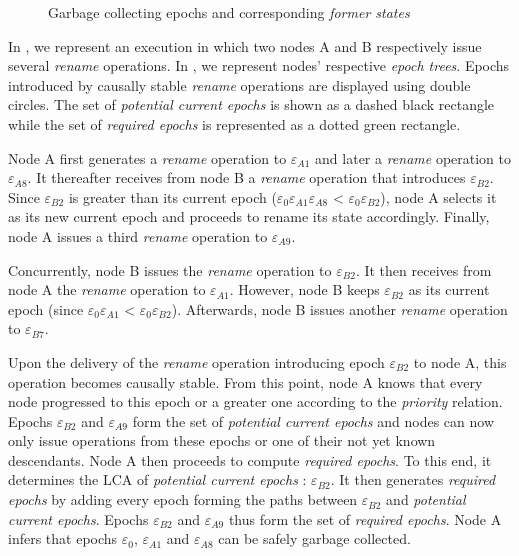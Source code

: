 \documentclass[10pt,journal,compsoc]{IEEEtran}
\let\MYoriglatexcaption\caption
\renewcommand{\caption}[2][\relax]{\MYoriglatexcaption[#2]{#2}}
\newcommand{\epoch}[1]{$\varepsilon_{#1}$}
\begin{document}
\begin{figure}[!ht]
{\begin{minipage}{\linewidth}
            \label{fig:GC-epoch-trees}
        \end{minipage}}
    \caption{Garbage collecting epochs and corresponding \emph{former states}}
    \label{fig:GC-epochs}
\end{figure}

In , we represent an execution in which two nodes A and B respectively issue several \emph{rename} operations.
In , we represent nodes' respective \emph{epoch trees}.
Epochs introduced by causally stable \emph{rename} operations are displayed using double circles.
The set of \emph{potential current epochs} is shown as a dashed black rectangle while the set of \emph{required epochs} is represented as a dotted green rectangle.

Node A first generates a \emph{rename} operation to \epoch{A1} and later a \emph{rename} operation to \epoch{A8}.
It thereafter receives from node B a \emph{rename} operation that introduces \epoch{B2}.
Since \epoch{B2} is greater than its current epoch (\epoch{0}\epoch{A1}\epoch{A8} < \epoch{0}\epoch{B2}), node A selects it as its new current epoch and proceeds to rename its state accordingly.
Finally, node A issues a third \emph{rename} operation to \epoch{A9}.

Concurrently, node B issues the \emph{rename} operation to \epoch{B2}.
It then receives from node A the \emph{rename} operation to \epoch{A1}.
However, node B keeps \epoch{B2} as its current epoch (since \epoch{0}\epoch{A1} < \epoch{0}\epoch{B2}).
Afterwards, node B issues another \emph{rename} operation to \epoch{B7}.

Upon the delivery of the \emph{rename} operation introducing epoch \epoch{B2} to node A, this operation becomes causally stable.
From this point, node A knows that every node progressed to this epoch or a greater one according to the \emph{priority} relation.
Epochs \epoch{B2} and \epoch{A9} form the set of \emph{potential current epochs} and nodes can now only issue operations from these epochs or one of their not yet known descendants.
Node A then proceeds to compute \emph{required epochs}.
To this end, it determines the \ac{LCA} of \emph{potential current epochs} : \epoch{B2}.
It then generates \emph{required epochs} by adding every epoch forming the paths between \epoch{B2} and \emph{potential current epochs}.
Epochs \epoch{B2} and \epoch{A9} thus form the set of \emph{required epochs}.
Node A infers that epochs \epoch{0}, \epoch{A1} and \epoch{A8} can be safely garbage collected.
\end{document}
